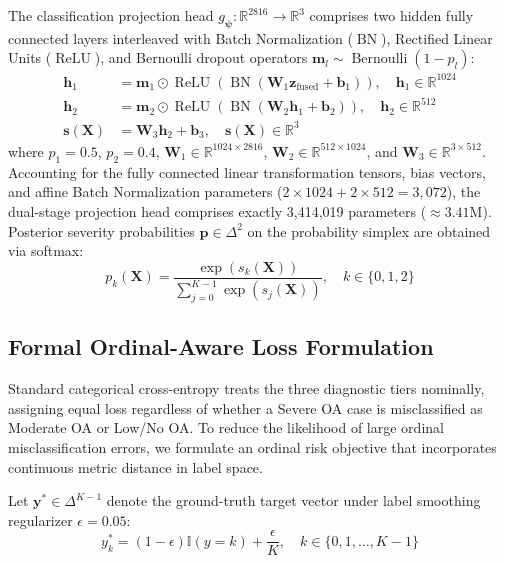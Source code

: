 \documentclass[10pt,journal]{IEEEtran}
\begin{document}
The classification projection head $g_{\bm{\psi}}: \mathbb{R}^{2816} \to \mathbb{R}^3$ comprises two hidden fully connected layers interleaved with Batch Normalization ($\operatorname{BN}$), Rectified Linear Units ($\operatorname{ReLU}$), and Bernoulli dropout operators $\mathbf{m}_l \sim \operatorname{Bernoulli}(1 - p_l)$:
\begin{align}
\mathbf{h}_1 &= \mathbf{m}_1 \odot \operatorname{ReLU}\left(\operatorname{BN}\left(\mathbf{W}_1 \mathbf{z}_{\text{fused}} + \mathbf{b}_1\right)\right), \quad \mathbf{h}_1 \in \mathbb{R}^{1024} \label{eq:head1}\\
\mathbf{h}_2 &= \mathbf{m}_2 \odot \operatorname{ReLU}\left(\operatorname{BN}\left(\mathbf{W}_2 \mathbf{h}_1 + \mathbf{b}_2\right)\right), \quad \mathbf{h}_2 \in \mathbb{R}^{512} \label{eq:head2}\\
\mathbf{s}(\mathbf{X}) &= \mathbf{W}_3 \mathbf{h}_2 + \mathbf{b}_3, \quad \mathbf{s}(\mathbf{X}) \in \mathbb{R}^{3} \label{eq:logits}
\end{align}
where $p_1 = 0.5$, $p_2 = 0.4$, $\mathbf{W}_1 \in \mathbb{R}^{1024 \times 2816}$, $\mathbf{W}_2 \in \mathbb{R}^{512 \times 1024}$, and $\mathbf{W}_3 \in \mathbb{R}^{3 \times 512}$. Accounting for the fully connected linear transformation tensors, bias vectors, and affine Batch Normalization parameters ($2 \times 1024 + 2 \times 512 = 3{,}072$), the dual-stage projection head comprises exactly 3,414,019 parameters ($\approx 3.41\text{M}$). Posterior severity probabilities $\mathbf{p} \in \Delta^2$ on the probability simplex are obtained via softmax:
\begin{equation}
p_k(\mathbf{X}) = \frac{\exp(s_k(\mathbf{X}))}{\sum_{j=0}^{K-1} \exp(s_j(\mathbf{X}))}, \quad k \in \{0, 1, 2\}
\label{eq:softmax}
\end{equation}

\subsection{Formal Ordinal-Aware Loss Formulation}
\label{subsec:loss}

Standard categorical cross-entropy treats the three diagnostic tiers nominally, assigning equal loss regardless of whether a Severe OA case is misclassified as Moderate OA or Low/No OA. To reduce the likelihood of large ordinal misclassification errors, we formulate an ordinal risk objective that incorporates continuous metric distance in label space.

Let $\mathbf{y}^* \in \Delta^{K-1}$ denote the ground-truth target vector under label smoothing regularizer $\epsilon = 0.05$:
\begin{equation}
y_k^* = (1 - \epsilon)\mathbb{I}(y = k) + \frac{\epsilon}{K}, \quad k \in \{0, 1, \dots, K-1\}
\label{eq:smoothed_label}
\end{equation}
\end{document}
